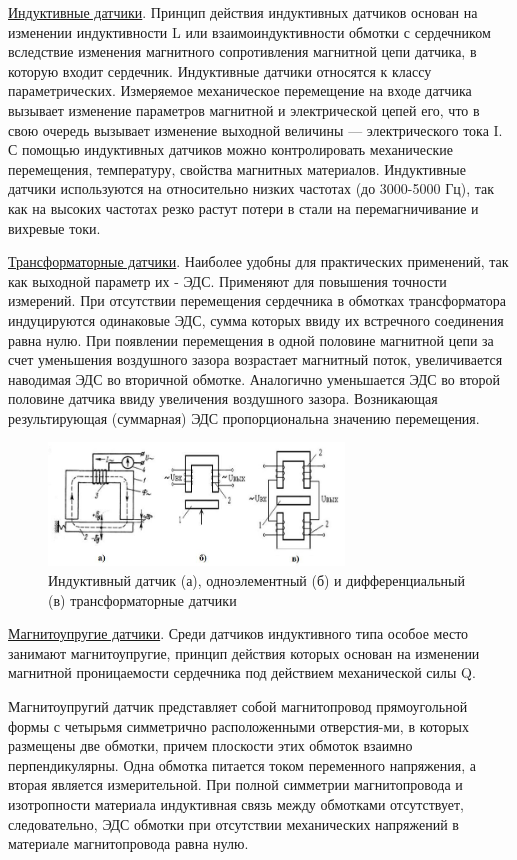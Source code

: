\documentclass[unicode, 12pt, a4paper, oneside]{article}
\begin{document}
\underline{Индуктивные датчики}. Принцип действия индуктивных датчиков основан на изменении индуктивности L или взаимоиндуктивности обмотки с сердечником вследствие изменения магнитного сопротивления магнитной цепи датчика, в которую входит сердечник. Индуктивные датчики относятся к классу параметрических. Измеряемое механическое перемещение на входе датчика вызывает изменение параметров магнитной и электрической цепей его, что в свою очередь вызывает изменение выходной величины — электрического тока I. С помощью индуктивных датчиков можно контролировать механические перемещения, температуру, свойства магнитных материалов. Индуктивные датчики используются на относительно низких частотах (до 3000-5000 Гц), так как на высоких частотах резко растут потери в стали на перемагничивание и вихревые токи.

\underline{Трансформаторные датчики}. Наиболее удобны для практических применений, так как выходной параметр их - ЭДС. Применяют для повышения точности измерений. При отсутствии перемещения сердечника в обмотках трансформатора индуцируются одинаковые ЭДС, сумма которых ввиду их встречного соединения равна нулю. При появлении перемещения в одной половине магнитной цепи за счет уменьшения воздушного зазора возрастает магнитный поток, увеличивается наводимая ЭДС во вторичной обмотке. Аналогично уменьшается ЭДС во второй половине датчика ввиду увеличения воздушного зазора. Возникающая результирующая (суммарная) ЭДС пропорциональна значению перемещения.

\begin{figure}[H]
\centering
\includegraphics[width=0.7\textwidth]{58.jpg}
\caption{Индуктивный датчик (а), одноэлементный (б) и дифференциальный (в) трансформаторные датчики}
\end{figure}

\underline{Магнитоупругие датчики}. Среди датчиков индуктивного типа особое место занимают магнитоупругие,  принцип действия которых основан на изменении магнитной проницаемости сердечника под действием механической силы Q.

Магнитоупругий датчик представляет собой магнитопровод  прямоугольной формы с четырьмя симметрично расположенными отверстия-ми, в которых размещены две обмотки, причем плоскости этих обмоток взаимно перпендикулярны. Одна обмотка питается током переменного напряжения, а вторая является измерительной. При полной симметрии магнитопровода и изотропности материала индуктивная связь между обмотками отсутствует, следовательно, ЭДС обмотки при отсутствии механических напряжений в материале магнитопровода равна нулю.
\end{document}

